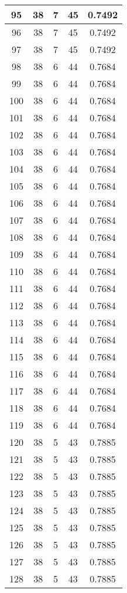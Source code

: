 \documentclass[letterpaper, 12pt]{article}
\begin{document}
\begin{longtable}{|c|c|c|c|c|}
95 & 38 & 7 & 45 & 0.7492 \\
\hline
96 & 38 & 7 & 45 & 0.7492 \\
\hline
97 & 38 & 7 & 45 & 0.7492 \\
\hline
98 & 38 & 6 & 44 & 0.7684 \\
\hline
99 & 38 & 6 & 44 & 0.7684 \\
\hline
100 & 38 & 6 & 44 & 0.7684 \\
\hline
101 & 38 & 6 & 44 & 0.7684 \\
\hline
102 & 38 & 6 & 44 & 0.7684 \\
\hline
103 & 38 & 6 & 44 & 0.7684 \\
\hline
104 & 38 & 6 & 44 & 0.7684 \\
\hline
105 & 38 & 6 & 44 & 0.7684 \\
\hline
106 & 38 & 6 & 44 & 0.7684 \\
\hline
107 & 38 & 6 & 44 & 0.7684 \\
\hline
108 & 38 & 6 & 44 & 0.7684 \\
\hline
109 & 38 & 6 & 44 & 0.7684 \\
\hline
110 & 38 & 6 & 44 & 0.7684 \\
\hline
111 & 38 & 6 & 44 & 0.7684 \\
\hline
112 & 38 & 6 & 44 & 0.7684 \\
\hline
113 & 38 & 6 & 44 & 0.7684 \\
\hline
114 & 38 & 6 & 44 & 0.7684 \\
\hline
115 & 38 & 6 & 44 & 0.7684 \\
\hline
116 & 38 & 6 & 44 & 0.7684 \\
\hline
117 & 38 & 6 & 44 & 0.7684 \\
\hline
118 & 38 & 6 & 44 & 0.7684 \\
\hline
119 & 38 & 6 & 44 & 0.7684 \\
\hline
120 & 38 & 5 & 43 & 0.7885 \\
\hline
121 & 38 & 5 & 43 & 0.7885 \\
\hline
122 & 38 & 5 & 43 & 0.7885 \\
\hline
123 & 38 & 5 & 43 & 0.7885 \\
\hline
124 & 38 & 5 & 43 & 0.7885 \\
\hline
125 & 38 & 5 & 43 & 0.7885 \\
\hline
126 & 38 & 5 & 43 & 0.7885 \\
\hline
127 & 38 & 5 & 43 & 0.7885 \\
\hline
128 & 38 & 5 & 43 & 0.7885 \\

\end{longtable}
\end{document}
